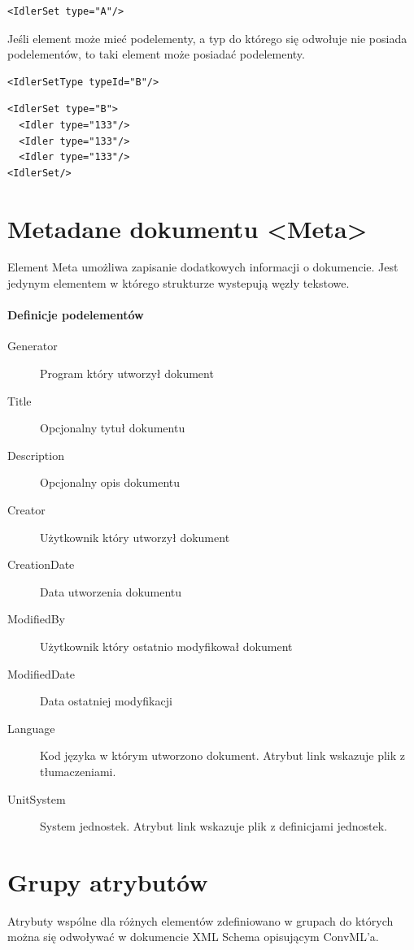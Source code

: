 \documentclass[12pt,a4paper]{article}
\begin{document}
\begin{verbatim}
<IdlerSet type="A"/>
\end{verbatim}

Jeśli element może mieć podelementy, a typ do którego się odwołuje nie posiada
podelementów, to taki element może posiadać podelementy.

\begin{verbatim}
<IdlerSetType typeId="B"/>
\end{verbatim}

\begin{verbatim}
<IdlerSet type="B">
  <Idler type="133"/>
  <Idler type="133"/>
  <Idler type="133"/>
<IdlerSet/>
\end{verbatim}

\section{Metadane dokumentu <Meta>}
Element Meta umożliwa zapisanie dodatkowych informacji o dokumencie. Jest jedynym elementem
w którego strukturze wystepują węzły tekstowe.

\paragraph{Definicje podelementów}
\begin{description}
\item[Generator] Program który utworzył dokument
\item[Title] Opcjonalny tytuł dokumentu
\item[Description] Opcjonalny opis dokumentu
\item[Creator] Użytkownik który utworzył dokument
\item[CreationDate] Data utworzenia dokumentu
\item[ModifiedBy] Użytkownik który ostatnio modyfikował dokument
\item[ModifiedDate] Data ostatniej modyfikacji
\item[Language] Kod języka w którym utworzono dokument.
	Atrybut link wskazuje plik z tłumaczeniami.
\item[UnitSystem] System jednostek. Atrybut link wskazuje plik z definicjami jednostek. 
\end{description}

\section{Grupy atrybutów}
Atrybuty wspólne dla różnych elementów zdefiniowano w grupach do których można się
odwoływać w dokumencie XML Schema opisującym ConvML'a.
\end{document}
